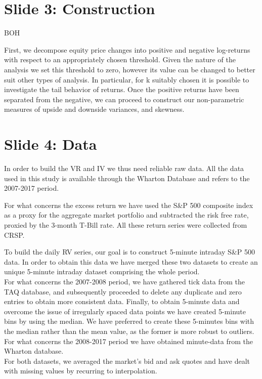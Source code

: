 \documentclass[12pt, letterpaper]{article}
\begin{document}
\section{Slide 3: Construction}

BOH 

First, we decompose equity price changes into positive and negative log-returns with respect to an appropriately chosen threshold. Given the nature of the analysis we set this threshold to zero, however its value can be changed to better suit other types of analysis. In particular, for k suitably chosen it is possible to investigate the tail behavior of returns. Once the positive returns have been separated from the negative, we can proceed to construct our non-parametric measures of upside and downside variances, and skewness.


\section{Slide 4: Data}
In order to build the VR and IV we thus need reliable raw data. All the data used in this study is available through the Wharton Database and refers to the 2007-2017 period.

\vspace{3mm}
\noindent
For what concerns the excess return we have used the S\&P 500 composite index as a proxy for the aggregate market portfolio and subtracted the risk free rate, proxied by the 3-month T-Bill rate.
All these return series were collected from CRSP. 

\vspace{3mm}
\noindent
To build the daily RV series, our goal is to construct 5-minute intraday S\&P 500 data. In order to obtain this data we have merged these two datasets to create an unique 5-minute intraday dataset comprising the whole period. \\
For what concerns the 2007-2008 period, we have gathered tick data from the TAQ database, and subsequently proceeded to delete any duplicate and zero entries to obtain more consistent data. Finally, to obtain 5-minute data and overcome the issue of irregularly spaced data points we have created 5-minute bins by using the median. We have preferred to create these 5-minutes bins with the median rather than the mean value, as the former is more robust to outliers. \\
For what concerns the 2008-2017 period we have obtained minute-data from the Wharton database.\\
For both datasets, we averaged the market’s bid and ask quotes and have dealt with missing values by recurring to interpolation.
\end{document}
